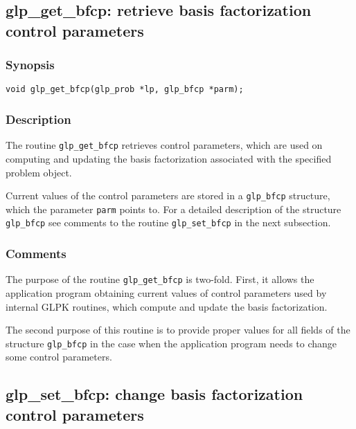 
\newpage

\subsection{glp\_get\_bfcp: retrieve basis factorization control
parameters}

\subsubsection*{Synopsis}

\begin{verbatim}
void glp_get_bfcp(glp_prob *lp, glp_bfcp *parm);
\end{verbatim}

\subsubsection*{Description}

The routine \verb|glp_get_bfcp| retrieves control parameters, which are
used on computing and updating the basis factorization associated with
the specified problem object.

Current values of the control parameters are stored in a \verb|glp_bfcp|
structure, which the parameter \verb|parm| points to. For a detailed
description of the structure \verb|glp_bfcp| see comments to the routine
\verb|glp_set_bfcp| in the next subsection.

\subsubsection*{Comments}

The purpose of the routine \verb|glp_get_bfcp| is two-fold. First, it
allows the application program obtaining current values of control
parameters used by internal GLPK routines, which compute and update the
basis factorization.

The second purpose of this routine is to provide proper values for all
fields of the structure \verb|glp_bfcp| in the case when the application
program needs to change some control parameters.

\subsection{glp\_set\_bfcp: change basis factorization control
parameters}

